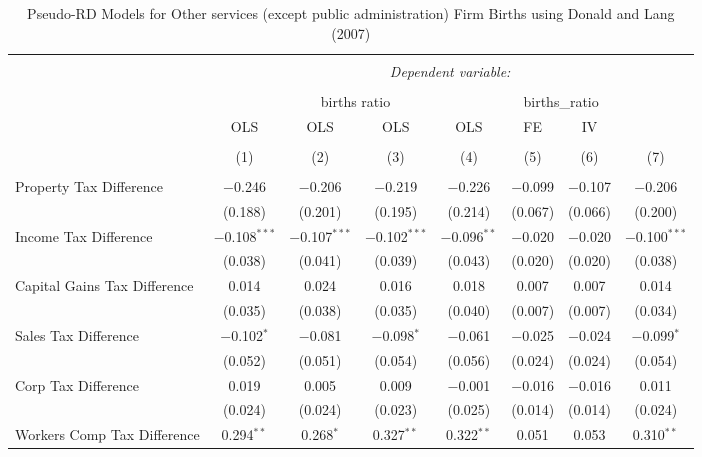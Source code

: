 
\begin{table}[!htbp] \centering 
  \caption{Pseudo-RD Models for  Other services (except public administration) Firm Births using Donald and Lang (2007)} 
  \label{} 
\begin{tabular}{@{\extracolsep{5pt}}lccccccc} 
\\[-1.8ex]\hline 
\hline \\[-1.8ex] 
 & \multicolumn{7}{c}{\textit{Dependent variable:}} \\ 
\cline{2-8} 
\\[-1.8ex] & \multicolumn{4}{c}{births ratio} & \multicolumn{2}{c}{births\_ratio} &   \\ 
 & OLS & OLS & OLS & OLS & FE & IV &  \\ 
\\[-1.8ex] & (1) & (2) & (3) & (4) & (5) & (6) & (7)\\ 
\hline \\[-1.8ex] 
 Property Tax Difference & $-$0.246 & $-$0.206 & $-$0.219 & $-$0.226 & $-$0.099 & $-$0.107 & $-$0.206 \\ 
  & (0.188) & (0.201) & (0.195) & (0.214) & (0.067) & (0.066) & (0.200) \\ 
  Income Tax Difference & $-$0.108$^{***}$ & $-$0.107$^{***}$ & $-$0.102$^{***}$ & $-$0.096$^{**}$ & $-$0.020 & $-$0.020 & $-$0.100$^{***}$ \\ 
  & (0.038) & (0.041) & (0.039) & (0.043) & (0.020) & (0.020) & (0.038) \\ 
  Capital Gains Tax Difference & 0.014 & 0.024 & 0.016 & 0.018 & 0.007 & 0.007 & 0.014 \\ 
  & (0.035) & (0.038) & (0.035) & (0.040) & (0.007) & (0.007) & (0.034) \\ 
  Sales Tax Difference & $-$0.102$^{*}$ & $-$0.081 & $-$0.098$^{*}$ & $-$0.061 & $-$0.025 & $-$0.024 & $-$0.099$^{*}$ \\ 
  & (0.052) & (0.051) & (0.054) & (0.056) & (0.024) & (0.024) & (0.054) \\ 
  Corp Tax Difference & 0.019 & 0.005 & 0.009 & $-$0.001 & $-$0.016 & $-$0.016 & 0.011 \\ 
  & (0.024) & (0.024) & (0.023) & (0.025) & (0.014) & (0.014) & (0.024) \\ 
  Workers Comp Tax Difference & 0.294$^{**}$ & 0.268$^{*}$ & 0.327$^{**}$ & 0.322$^{**}$ & 0.051 & 0.053 & 0.310$^{**}$ \\ 

\end{tabular}
\end{table}
